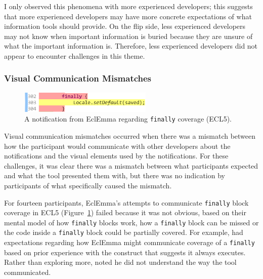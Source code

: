 I only observed this phenomena with more experienced developers; this suggests that more experienced developers may have more concrete expectations of what information tools should provide.
On the flip side, less experienced developers may not know when important information is buried because they are unsure of what the important information is. Therefore, less experienced developers did not appear to encounter challenges in this theme.

\vspace{1.5em}

\subsubsection{Visual Communication Mismatches}\label{subsec:expectations}

\begin{figure} \centering \includegraphics[width=2.5in]{Chapter-4/figs/finally-block}
	\caption{A notification from EclEmma regarding \texttt{finally} coverage (ECL5).}
	\label{fig:finally}
\end{figure}


Visual communication mismatches occurred when there was a mismatch between how the participant would communicate with other developers about the notifications and the visual elements used by the notifications.
For these challenges, it was clear there was a mismatch between what participants expected and what the tool presented them with, but there was no indication by participants of what specifically caused the mismatch.

For fourteen participants, EclEmma's attempts to communicate \texttt{finally} block coverage in ECL5 (Figure~\ref{fig:finally}) failed because it was not obvious, based on their mental model of how \texttt{finally} blocks work, how a \texttt{finally} block can be missed or the code inside a \texttt{finally} block could be partially covered. For example,  had expectations regarding how EclEmma might communicate coverage of a \texttt{finally} based on prior experience with the construct that suggests it always executes. Rather than exploring more,  noted he did not understand the way the tool communicated. 

